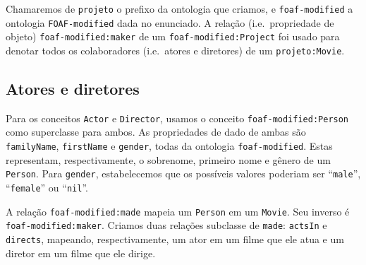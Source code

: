 \documentclass{article}
\newcommand{\code}[1]{\lstinline[mathescape=true]{#1}}
\begin{document}
Chamaremos de \code{projeto} o prefixo da ontologia que criamos, e \code{foaf-modified} a ontologia
\code{FOAF-modified} dada no enunciado. A relação (i.e.\ propriedade de objeto)
\code{foaf-modified:maker} de um \code{foaf-modified:Project} foi usado para denotar todos os
colaboradores (i.e.\ atores e diretores) de um \code{projeto:Movie}.

\subsection{Atores e diretores}

Para os conceitos \code{Actor} e \code{Director}, usamos o conceito \code{foaf-modified:Person}
como superclasse para ambos. As propriedades de dado de ambas são \code{familyName},
\code{firstName} e \code{gender}, todas da ontologia \code{foaf-modified}. Estas representam,
respectivamente, o sobrenome, primeiro nome e gênero de um \code{Person}. Para \code{gender},
estabelecemos que os possíveis valores poderiam ser ``\code{male}'', ``\code{female}'' ou
``\code{nil}''.

A relação \code{foaf-modified:made} mapeia um \code{Person} em um \code{Movie}. Seu inverso é
\code{foaf-modified:maker}. Criamos duas relações subclasse de \code{made}: \code{actsIn} e
\code{directs}, mapeando, respectivamente, um ator em um filme que ele atua e um diretor em um
filme que ele dirige.

\end{document}
